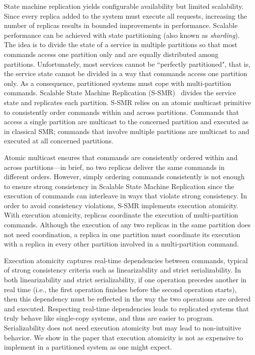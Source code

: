 \documentclass[11pt]{article}
\begin{document}
State machine replication yields configurable availability but limited scalability.
Since every replica added to the system must execute all requests, 
increasing the number of replicas results in bounded improvements in performance.
Scalable performance can be achieved with state partitioning (also known as \emph{sharding}).
The idea is to divide the state of a service in multiple partitions so that most commands access one partition only and are equally distributed among partitions. 
Unfortunately, most services cannot be ``perfectly partitioned", that is, the service state cannot be divided in a way that commands access one partition only.
As a consequence, partitioned systems must cope with multi-partition commands.
Scalable State Machine Replication (S-SMR)~\cite{bezerra2014ssmr} divides the service state and replicates each partition. 
S-SMR relies on an atomic multicast primitive to consistently order commands within and across partitions. 
Commands that access a single partition are multicast to the concerned partition and executed as in classical SMR;
commands that involve multiple partitions are multicast to and executed at all concerned partitions.

Atomic multicast ensures that commands are consistently ordered within and across partitions---in brief, no two replicas deliver the same commands in different orders.
However, simply ordering commands consistently is not enough to ensure strong consistency in Scalable State Machine Replication since the execution of commands can interleave in ways that violate strong consistency.
In order to avoid consistency violations, S-SMR implements execution atomicity. 
With execution atomicity, replicas coordinate the execution of multi-partition commands.
Although the execution of any two replicas in the same partition does not need coordination, a replica in one partition must coordinate its execution with a replica in every other partition involved in a multi-partition command.

Execution atomicity captures real-time dependencies between commands, typical of strong consistency criteria such as linearizability and strict serializability.
In both linearizability and strict serializability, if one operation precedes another in real time (i.e., the first operation finishes before the second operation starts), then this dependency must be reflected in the way the two operations are ordered and executed.
Respecting real-time dependencies leads to replicated systems that truly behave like single-copy systems, and thus are easier to program.
Serializability does not need execution atomicity but may lead to non-intuitive behavior.
We show in the paper that execution atomicity is not as expensive to implement in a partitioned system as one might expect.
\end{document}

